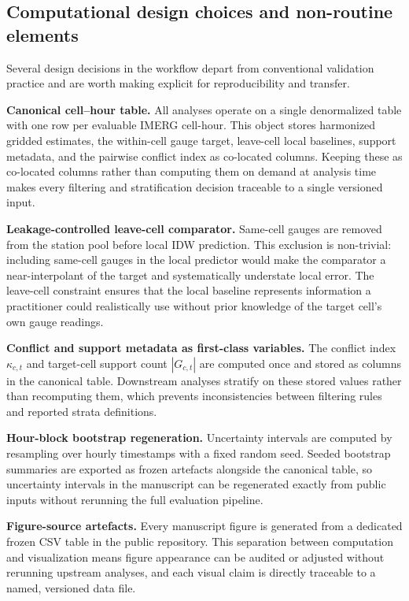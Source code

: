 \documentclass[preprint,12pt]{elsarticle}
\begin{document}
\subsection{Computational design choices and non-routine elements}

Several design decisions in the workflow depart from conventional validation practice and are worth making explicit for reproducibility and transfer.

\textbf{Canonical cell--hour table.} All analyses operate on a single denormalized table with one row per evaluable IMERG cell-hour. This object stores harmonized gridded estimates, the within-cell gauge target, leave-cell local baselines, support metadata, and the pairwise conflict index as co-located columns. Keeping these as co-located columns rather than computing them on demand at analysis time makes every filtering and stratification decision traceable to a single versioned input.

\textbf{Leakage-controlled leave-cell comparator.} Same-cell gauges are removed from the station pool before local IDW prediction. This exclusion is non-trivial: including same-cell gauges in the local predictor would make the comparator a near-interpolant of the target and systematically understate local error. The leave-cell constraint ensures that the local baseline represents information a practitioner could realistically use without prior knowledge of the target cell's own gauge readings.

\textbf{Conflict and support metadata as first-class variables.} The conflict index $\kappa_{c,t}$ and target-cell support count $|G_{c,t}|$ are computed once and stored as columns in the canonical table. Downstream analyses stratify on these stored values rather than recomputing them, which prevents inconsistencies between filtering rules and reported strata definitions.

\textbf{Hour-block bootstrap regeneration.} Uncertainty intervals are computed by resampling over hourly timestamps with a fixed random seed. Seeded bootstrap summaries are exported as frozen artefacts alongside the canonical table, so uncertainty intervals in the manuscript can be regenerated exactly from public inputs without rerunning the full evaluation pipeline.

\textbf{Figure-source artefacts.} Every manuscript figure is generated from a dedicated frozen CSV table in the public repository. This separation between computation and visualization means figure appearance can be audited or adjusted without rerunning upstream analyses, and each visual claim is directly traceable to a named, versioned data file.
\end{document}
